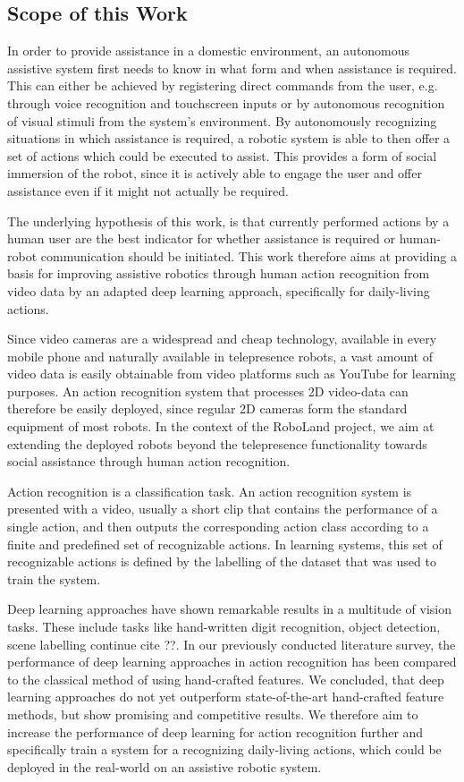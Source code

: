 \subsection{Scope of this Work}
In order to provide assistance in a domestic environment, an autonomous assistive system first needs to know in what form and when assistance is required.
This can either be achieved by registering direct commands from the user, e.g. through voice recognition and touchscreen inputs or by autonomous recognition of visual stimuli from the system's environment.
By autonomously recognizing situations in which assistance is required, a robotic system is able to then offer a set of actions which could be executed to assist.
This provides a form of social immersion of the robot, since it is actively able to engage the user and offer assistance even if it might not actually be required. 

The underlying hypothesis of this work, is that currently performed actions by a human user are the best indicator for whether assistance is required or human-robot communication should be initiated.
This work therefore aims at providing a basis for improving assistive robotics through human action recognition from video data by an adapted deep learning approach, specifically for daily-living actions.

Since video cameras are a widespread and cheap technology, available in every mobile phone and naturally available in telepresence robots, a vast amount of video data is easily obtainable from video platforms such as YouTube for learning purposes.
An action recognition system that processes 2D video-data can therefore be easily deployed, since regular 2D cameras form the standard equipment of most robots.
In the context of the RoboLand project, we aim at extending the deployed robots beyond the telepresence functionality towards social assistance through human action recognition.

Action recognition is a classification task.
An action recognition system is presented with a video, usually a short clip that contains the performance of a single action, and then outputs the corresponding action class according to a finite and predefined set of recognizable actions.
In learning systems, this set of recognizable actions is defined by the labelling of the dataset that was used to train the system.

Deep learning approaches have shown remarkable results in a multitude of vision tasks.
These include tasks like hand-written digit recognition, object detection, scene labelling continue cite ??.
In our previously conducted literature survey, the performance of deep learning approaches in action recognition has been compared to the classical method of using hand-crafted features.
We concluded, that deep learning approaches do not yet outperform state-of-the-art hand-crafted feature methods, but show promising and competitive results.
We therefore aim to increase the performance of deep learning for action recognition further and specifically train a system for a recognizing daily-living actions, which could be deployed in the real-world on an assistive robotic system.

